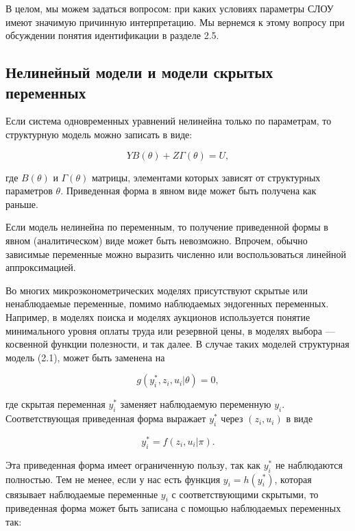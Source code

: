 	В целом, мы можем задаться вопросом: при каких условиях параметры СЛОУ имеют значимую причинную интерпретацию. Мы вернемся к этому вопросу при обсуждении понятия идентификации в разделе 2.5.

\subsection{Нелинейный модели и модели скрытых переменных}


Если система одновременных уравнений нелинейна только по параметрам, то структурную модель можно записать в виде:



\begin{equation}
YB(\theta)+Z\Gamma(\theta)=U,
\end{equation}

где $B(\theta)$ и $\Gamma(\theta)$ матрицы, элементами которых зависят от структурных параметров $\theta$. Приведенная форма в явном виде может быть получена как раньше. 

Если модель нелинейна по переменным, то получение приведенной формы в явном (аналитическом) виде может быть невозможно. Впрочем, обычно зависимые переменные можно выразить численно или воспользоваться линейной аппроксимацией.


Во многих микроэконометрических моделях присутствуют скрытые или ненаблюдаемые переменные, помимо наблюдаемых эндогенных переменных. Например, в моделях поиска и моделях аукционов используется понятие минимального уровня оплаты труда или резервной цены, в моделях выбора --- косвенной функции полезности, и так далее. В случае таких моделей структурная модель (2.1), может быть заменена на

\begin{equation}
g(y^{\ast}_{i},z_{i},u_{i}|\theta)=0,
\end{equation}

где скрытая переменная $y^{\ast}_{i}$ заменяет наблюдаемую переменную $y_{i}$. Соответствующая приведенная форма выражает $y^{\ast}_{i}$ через $(z_{i},u_{i})$ в виде

\begin{equation}
y^{\ast}_{i}=f(z_{i},u_{i}|\pi).
\end{equation}


Эта приведенная форма имеет ограниченную пользу, так как $y^{\ast}_{i}$ не наблюдаются полностью. Тем не менее, если у нас есть функция $y_{i}=h(y^{\ast}_{i})$, которая связывает  наблюдаемые  переменные $y_{i}$ с соответствующими скрытыми, то приведенная форма может быть записана с помощью  наблюдаемых переменных  так:

